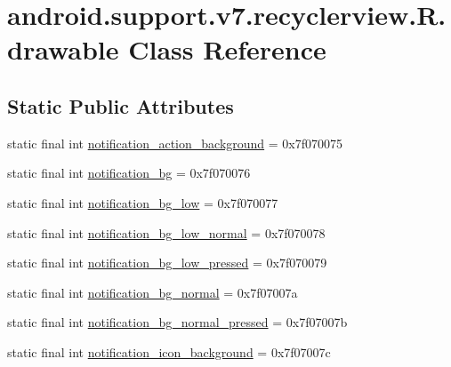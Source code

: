 \hypertarget{classandroid_1_1support_1_1v7_1_1recyclerview_1_1_r_1_1drawable}{}\section{android.\+support.\+v7.\+recyclerview.\+R.\+drawable Class Reference}
\label{classandroid_1_1support_1_1v7_1_1recyclerview_1_1_r_1_1drawable}
\subsection*{Static Public Attributes}
\begin{DoxyCompactItemize}
\item 
static final int \mbox{\hyperlink{classandroid_1_1support_1_1v7_1_1recyclerview_1_1_r_1_1drawable_a94ca1a9850cea62dab00fb3505930a59}{notification\+\_\+action\+\_\+background}} = 0x7f070075
\item 
static final int \mbox{\hyperlink{classandroid_1_1support_1_1v7_1_1recyclerview_1_1_r_1_1drawable_a0bf2ac43c54dd606778a2e103013605f}{notification\+\_\+bg}} = 0x7f070076
\item 
static final int \mbox{\hyperlink{classandroid_1_1support_1_1v7_1_1recyclerview_1_1_r_1_1drawable_a42699770e49598db6ff90796106e7b81}{notification\+\_\+bg\+\_\+low}} = 0x7f070077
\item 
static final int \mbox{\hyperlink{classandroid_1_1support_1_1v7_1_1recyclerview_1_1_r_1_1drawable_a49407e99ee20b81ba38cb9c26f8fde91}{notification\+\_\+bg\+\_\+low\+\_\+normal}} = 0x7f070078
\item 
static final int \mbox{\hyperlink{classandroid_1_1support_1_1v7_1_1recyclerview_1_1_r_1_1drawable_a2dd97900efe14bbb29bbbd9cdd6eb9e7}{notification\+\_\+bg\+\_\+low\+\_\+pressed}} = 0x7f070079
\item 
static final int \mbox{\hyperlink{classandroid_1_1support_1_1v7_1_1recyclerview_1_1_r_1_1drawable_a3910d3d1677858ab7237dffb0d693d80}{notification\+\_\+bg\+\_\+normal}} = 0x7f07007a
\item 
static final int \mbox{\hyperlink{classandroid_1_1support_1_1v7_1_1recyclerview_1_1_r_1_1drawable_a75d2619b0abb694006ea86fbe5dbbd8d}{notification\+\_\+bg\+\_\+normal\+\_\+pressed}} = 0x7f07007b
\item 
static final int \mbox{\hyperlink{classandroid_1_1support_1_1v7_1_1recyclerview_1_1_r_1_1drawable_aea2f3dfe59f21f41485aba2f00aa8a88}{notification\+\_\+icon\+\_\+background}} = 0x7f07007c

\end{DoxyCompactItemize}
